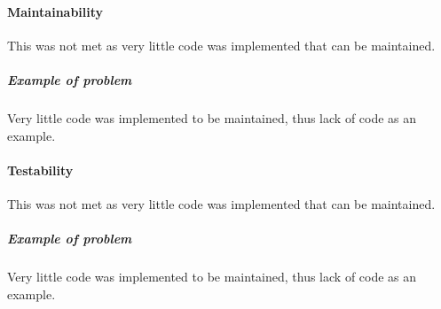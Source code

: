 \paragraph{Maintainability}
	This was not met as very little code was implemented that can be maintained.
	\subparagraph{Example of problem}
		Very little code was implemented to be maintained, thus lack of code as an example.
		
\paragraph{Testability}
	This was not met as very little code was implemented that can be maintained.
	\subparagraph{Example of problem}
		Very little code was implemented to be maintained, thus lack of code as an example.